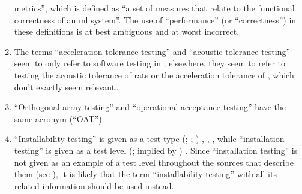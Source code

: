 \begin{enumerate}
          metrics'', which is defined as ``a set of measures that relate to the
          functional correctness of an \acs{ml} system''. The use
          of ``performance'' (or ``correctness'') in these definitions is at
          best ambiguous and at worst incorrect.
    \item %
          The terms ``acceleration tolerance testing'' and ``acoustic tolerance
          testing'' seem to only refer to software testing in
          \citep[p.~56]{Firesmith2015};
          elsewhere, they seem to refer to testing the acoustic tolerance of
          rats \citep{HolleyEtAl1996} or the acceleration tolerance of
          \accelTolTest{}, which don't exactly seem relevant\dots%
    \item %
          ``Orthogonal array testing'' \ifnotpaper \citetext{%
                  \citealp[pp.~5-1,~5-11]{SWEBOK2024};
                  implied by \citealp[pp.~467,~473]{Valcheva2013};
                  \citealp[pp.~1573-1577,~1580]{YuEtAl2011}} \else
              \cite[pp.~5-1,~5-11]{SWEBOK2024} \fi and ``operational
          acceptance testing'' \citep[p.~30]{Firesmith2015} have the same
          acronym (``OAT'').

    \item %
          ``Installability testing'' is given as a test type
          \ifnotpaper
              (\citealp[p.~22]{IEEE2022}; \citeyear[p.~38]{IEEE2021};
              \citeyear[p.~228]{IEEE2017})%
          \else
              \cite[p.~22]{IEEE2022}, \cite[p.~38]{IEEE2021}, \cite[p.~228]{IEEE2017}%
          \fi, while ``installation testing'' is given as a test level
          \ifnotpaper
              (\citealp[p.~439]{vanVliet2000}; implied by
              \citealp[p.~5-8]{SWEBOK2024})%
          \else
              \cite[p.~439]{vanVliet2000}%
          \fi. Since ``installation testing'' is not given as an example of a
          test level throughout the sources that describe them (see
          ), it is likely that the term ``installability
          testing'' with all its related information should be used instead.


\end{enumerate}
